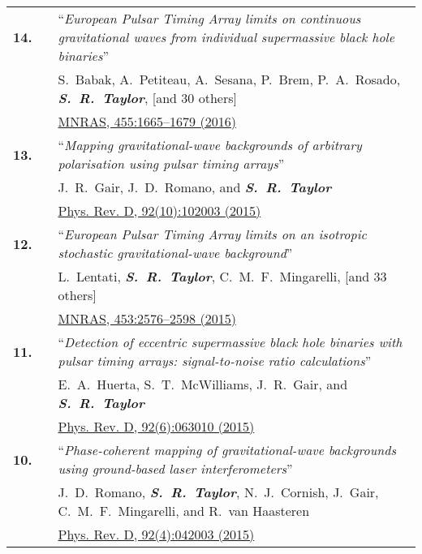 \documentclass[11pt,letterpaper,sans]{moderncv}
\begin{document}
{\begin{longtable}{rp{0.3cm}p{15.8cm}}
\textbf{14.} & & ``\textit{European Pulsar Timing Array limits on continuous gravitational waves from individual supermassive black hole binaries}'' \\ 
&& S.~Babak, A.~Petiteau, A.~Sesana, P.~Brem, P.~A.~Rosado, \textit{\textbf{S.~R.~Taylor}}, [and 30 others] \\ 
&& \href{http://mnras.oxfordjournals.org/content/455/2/1665}{{\color{color1} MNRAS, 455:1665--1679 (2016)}} \vspace{0.09cm}\\
\textbf{13.} & & ``\textit{Mapping gravitational-wave backgrounds of arbitrary polarisation using pulsar timing arrays}'' \\ 
&& J.~R.~Gair, J.~D.~Romano, and \textit{\textbf{S.~R.~Taylor}} \\ 
&& \href{http://journals.aps.org/prd/abstract/10.1103/PhysRevD.92.102003}{{\color{color1} Phys. Rev. D, 92(10):102003 (2015)}} \vspace{0.09cm}\\
\textbf{12.} & & ``\textit{European Pulsar Timing Array limits on an isotropic stochastic gravitational-wave background}'' \\ 
&& L.~Lentati, \textit{\textbf{S.~R.~Taylor}}, C.~M.~F.~Mingarelli, [and 33 others] \\ 
&& \href{http://mnras.oxfordjournals.org/content/453/3/2576}{{\color{color1} MNRAS, 453:2576--2598 (2015)}} \vspace{0.09cm}\\
\textbf{11.} & & ``\textit{Detection of eccentric supermassive black hole binaries with pulsar timing arrays: signal-to-noise ratio calculations}'' \\ 
&& E.~A.~Huerta, S.~T.~McWilliams, J.~R.~Gair, and \textit{\textbf{S.~R.~Taylor}} \\ 
&& \href{http://journals.aps.org/prd/abstract/10.1103/PhysRevD.92.063010}{{\color{color1} Phys. Rev. D, 92(6):063010 (2015)}} \vspace{0.09cm}\\
\textbf{10.} & & ``\textit{Phase-coherent mapping of gravitational-wave backgrounds using ground-based laser interferometers}'' \\ 
&& J.~D.~Romano, \textit{\textbf{S.~R.~Taylor}}, N.~J.~Cornish, J.~Gair, C.~M.~F.~Mingarelli, and R.~van Haasteren \\ 
&& \href{http://journals.aps.org/prd/abstract/10.1103/PhysRevD.92.042003}{{\color{color1} Phys. Rev. D, 92(4):042003 (2015)}} \vspace{0.09cm}\\

\end{longtable}}
\end{document}
